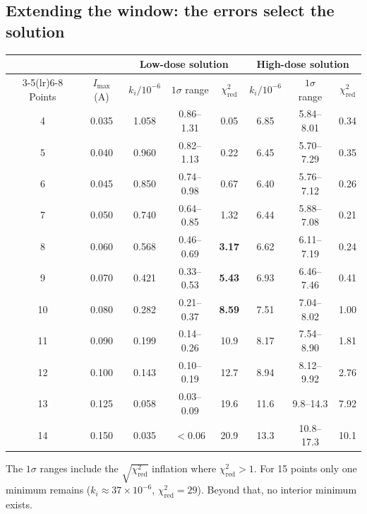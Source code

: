 \documentclass[11pt,a4paper]{article}
\newcommand{\kan}{k_i}
\begin{document}
\subsection{Extending the window: the errors select the solution}
\label{sec:window}

\begin{center}
\small
\begin{tabular}{cc ccc ccc}
\toprule
 & & \multicolumn{3}{c}{Low-dose solution} & \multicolumn{3}{c}{High-dose solution}\\
\cmidrule(lr){3-5}\cmidrule(lr){6-8}
Points & $I_\text{max}$ (A) & $\kan/10^{-6}$ & $1\sigma$ range & $\chi^2_\text{red}$ & $\kan/10^{-6}$ & $1\sigma$ range & $\chi^2_\text{red}$\\
\midrule
4  & 0.035 & 1.058 & 0.86--1.31 & 0.05 & 6.85 & 5.84--8.01 & 0.34\\
5  & 0.040 & 0.960 & 0.82--1.13 & 0.22 & 6.45 & 5.70--7.29 & 0.35\\
6  & 0.045 & 0.850 & 0.74--0.98 & 0.67 & 6.40 & 5.76--7.12 & 0.26\\
7  & 0.050 & 0.740 & 0.64--0.85 & 1.32 & 6.44 & 5.88--7.08 & 0.21\\
8  & 0.060 & 0.568 & 0.46--0.69 & \textbf{3.17} & 6.62 & 6.11--7.19 & 0.24\\
9  & 0.070 & 0.421 & 0.33--0.53 & \textbf{5.43} & 6.93 & 6.46--7.46 & 0.41\\
10 & 0.080 & 0.282 & 0.21--0.37 & \textbf{8.59} & 7.51 & 7.04--8.02 & 1.00\\
11 & 0.090 & 0.199 & 0.14--0.26 & 10.9 & 8.17 & 7.54--8.90 & 1.81\\
12 & 0.100 & 0.143 & 0.10--0.19 & 12.7 & 8.94 & 8.12--9.92 & 2.76\\
13 & 0.125 & 0.058 & 0.03--0.09 & 19.6 & 11.6 & 9.8--14.3 & 7.92\\
14 & 0.150 & 0.035 & $<0.06$ & 20.9 & 13.3 & 10.8--17.3 & 10.1\\
\bottomrule
\end{tabular}
\end{center}
\noindent The $1\sigma$ ranges include the $\sqrt{\chi^2_\text{red}}$ inflation where $\chi^2_\text{red}>1$. For 15 points only one minimum remains ($\kan\approx 37\times10^{-6}$, $\chi^2_\text{red}=29$). Beyond that, no interior minimum exists.
\end{document}
